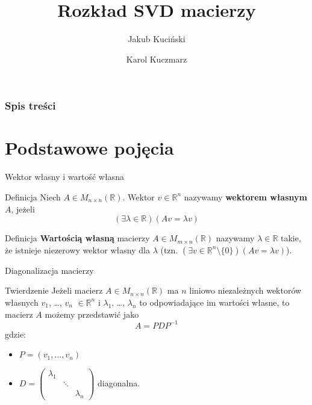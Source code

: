 \documentclass{beamer}
\title[Rozkład SVD]{Rozkład SVD macierzy}
\author[Kuciński, Kuczmarz]{Jakub Kuciński \and Karol Kuczmarz}
\date{\displaydate{date}}
\begin{document}
\frame{\titlepage}

\begin{frame}
\frametitle{Spis treści}
\tableofcontents
\end{frame}



\section{Podstawowe pojęcia}

\begin{frame}{Wektor własny i wartość własna}
\begin{block}{Definicja}
Niech $A \in M_{n \times n} (\mathbb{R})$. Wektor $v \in \mathbb{R}^n$ nazywamy \textbf{wektorem własnym} $A$, jeżeli
$$ (\exists \lambda \in \mathbb{R}) (Av = \lambda v) $$
\end{block}
\pause
\begin{block}{Definicja}
\textbf{Wartością własną} macierzy $A \in M_{m \times n}(\mathbb{R})$ nazywamy $\lambda \in \mathbb{R}$ takie, że istnieje niezerowy wektor własny dla $\lambda$ (tzn. $(\exists v \in \mathbb{R}^n \setminus \{ 0 \} ) (Av=\lambda v) $). 
\end{block}
    
\end{frame}

\begin{frame}{Diagonalizacja macierzy}
\begin{block}{Twierdzenie}
Jeżeli macierz $A \in M_{n \times n} (\mathbb{R})$ ma $n$ liniowo niezależnych wektorów własnych $v_1$, \ldots, $v_n$ $\in \mathbb{R}^n $ i $\lambda_1$, \ldots, $\lambda_n$ to odpowiadające im wartości własne, to macierz $A$ możemy przedstawić jako
$$ A = PDP^{-1} $$
gdzie:
\begin{itemize}
    \item $P = (v_1, \ldots, v_n)$
    \item $D = \begin{pmatrix} \lambda_1 & & \\ & \ddots & \\
     & & \lambda_n \end{pmatrix} $ diagonalna.
\end{itemize}
\end{block}
\end{frame}
\end{document}
